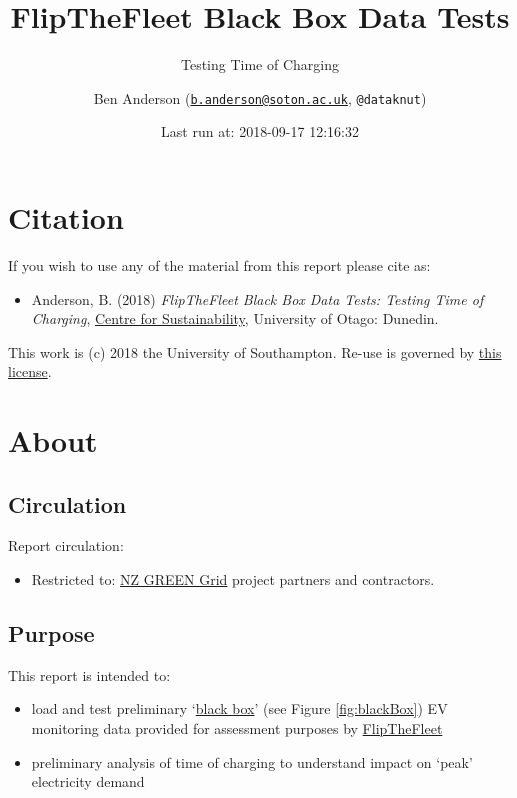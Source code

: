 \documentclass[]{article}
\title{FlipTheFleet Black Box Data Tests}
\subtitle{Testing Time of Charging}
\author{Ben Anderson
(\href{mailto:b.anderson@soton.ac.uk}{\nolinkurl{b.anderson@soton.ac.uk}},
\texttt{@dataknut})}
\date{Last run at: 2018-09-17 12:16:32}
\providecommand{\tightlist}{%
  \setlength{\itemsep}{0pt}\setlength{\parskip}{0pt}}
\begin{document}
\maketitle

{
\setcounter{tocdepth}{2}
\tableofcontents
}
\newpage

\section{Citation}\label{citation}

If you wish to use any of the material from this report please cite as:

\begin{itemize}
\tightlist
\item
  Anderson, B. (2018) \emph{FlipTheFleet Black Box Data Tests: Testing
  Time of Charging},
  \href{http://www.otago.ac.nz/centre-sustainability/}{Centre for
  Sustainability}, University of Otago: Dunedin.
\end{itemize}

This work is (c) 2018 the University of Southampton. Re-use is governed
by \href{https://github.com/CfSOtago/GREENGrid/blob/master/LICENSE}{this
license}.

\newpage

\section{About}\label{about}

\subsection{Circulation}\label{circulation}

Report circulation:

\begin{itemize}
\tightlist
\item
  Restricted to:
  \href{https://www.otago.ac.nz/centre-sustainability/research/energy/otago050285.html}{NZ
  GREEN Grid} project partners and contractors.
\end{itemize}

\subsection{Purpose}\label{purpose}

This report is intended to:

\begin{itemize}
\tightlist
\item
  load and test preliminary
  `\href{https://flipthefleet.org/ev-black-box/}{black box}' (see Figure
  \ref{fig:blackBox}) EV monitoring data provided for assessment
  purposes by \href{http://flipthefleet.org/}{FlipTheFleet}
\item
  preliminary analysis of time of charging to understand impact on
  `peak' electricity demand
\end{itemize}
\end{document}
